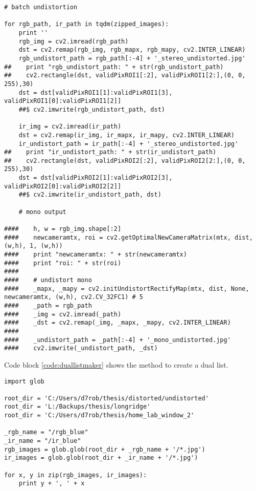 \begin{appendices}
\begin{lstlisting}
# batch undistortion

for rgb_path, ir_path in tqdm(zipped_images):
    print ''
    rgb_img = cv2.imread(rgb_path)
    dst = cv2.remap(rgb_img, rgb_mapx, rgb_mapy, cv2.INTER_LINEAR)
    rgb_undistort_path = rgb_path[:-4] + '_stereo_undistorted.jpg'
##    print "rgb_undistort_path: " + str(rgb_undistort_path)
##    cv2.rectangle(dst, validPixROI1[:2], validPixROI1[2:],(0, 0, 255),30)
    dst = dst[validPixROI1[1]:validPixROI1[3], validPixROI1[0]:validPixROI1[2]]
    ##$ cv2.imwrite(rgb_undistort_path, dst)

    ir_img = cv2.imread(ir_path)
    dst = cv2.remap(ir_img, ir_mapx, ir_mapy, cv2.INTER_LINEAR)
    ir_undistort_path = ir_path[:-4] + '_stereo_undistorted.jpg'
##    print "ir_undistort_path: " + str(ir_undistort_path)
##    cv2.rectangle(dst, validPixROI2[:2], validPixROI2[2:],(0, 0, 255),30)
    dst = dst[validPixROI2[1]:validPixROI2[3], validPixROI2[0]:validPixROI2[2]]
    ##$ cv2.imwrite(ir_undistort_path, dst)

    # mono output

####    h, w = rgb_img.shape[:2]
####    newcameramtx, roi = cv2.getOptimalNewCameraMatrix(mtx, dist, (w,h), 1, (w,h))
####    print "newcameramtx: " + str(newcameramtx)
####    print "roi: " + str(roi)
####
####    # undistort mono
####    _mapx, _mapy = cv2.initUndistortRectifyMap(mtx, dist, None, newcameramtx, (w,h), cv2.CV_32FC1) # 5
####    _path = rgb_path
####    _img = cv2.imread(_path)
####    _dst = cv2.remap(_img, _mapx, _mapy, cv2.INTER_LINEAR)
####
####    _undistort_path = _path[:-4] + '_mono_undistorted.jpg'
####    cv2.imwrite(_undistort_path, _dst)

\end{lstlisting}

\newpage
Code block \ref{code:duallistmaker} shows the method to create a dual list.

\begin{lstlisting}
import glob

root_dir = 'C:/Users/d7rob/thesis/distorted/undistorted'
root_dir = 'L:/Backups/thesis/longridge'
root_dir = 'C:/Users/d7rob/thesis/home_lab_window_2'

_rgb_name = "/rgb_blue"
_ir_name = "/ir_blue"
rgb_images = glob.glob(root_dir + _rgb_name + '/*.jpg')
ir_images = glob.glob(root_dir + _ir_name + '/*.jpg')

for x, y in zip(rgb_images, ir_images):
    print y + ', ' + x


\end{lstlisting}
\end{appendices}
